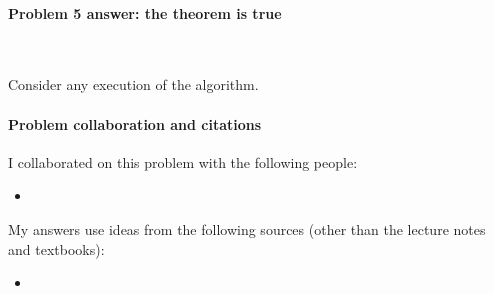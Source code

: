\paragraph{Problem 5 answer: the theorem is true}~

\begin{longFormProof}

  \step Consider any execution of the algorithm.

  \begin{blue}

    \step \REPLACEME 

    \step \REPLACEME

  \end{blue}

\end{longFormProof}


\vfill%

\paragraph{Problem  collaboration and citations}

I collaborated on this problem with the following people:
\begin{blue}
  \begin{itemize}
  \item \REPLACEME                    %
  \end{itemize}
\end{blue}

My answers use ideas from the following sources (other than the lecture notes and textbooks): 
\begin{blue}
  \begin{itemize}
  \item \REPLACEME                    %
  \end{itemize}
\end{blue}


